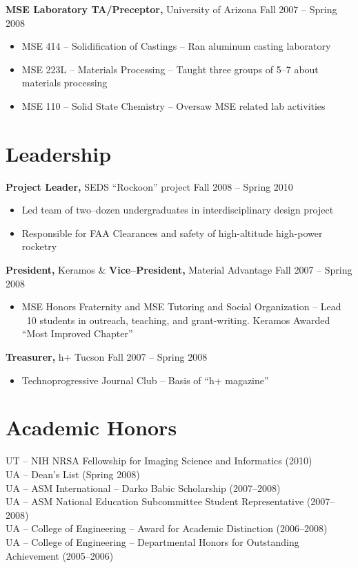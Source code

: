 \documentclass{res}
\begin{document}
\begin{resume}
{\bf MSE Laboratory TA/Preceptor,} University of Arizona \hfill Fall 2007 -- Spring 2008
\begin{itemize} \itemsep -2pt 
\item MSE 414 -- Solidification of Castings -- Ran aluminum casting laboratory 
\item MSE 223L -- Materials Processing -- Taught three groups of 5--7
  about materials processing
\item MSE 110 -- Solid State Chemistry -- Oversaw MSE related lab
  activities
\end{itemize}

\section{Leadership} 
{\bf Project Leader,}  SEDS ``Rockoon''  project \hfill   Fall 2008 -- Spring 2010
\begin{itemize} \itemsep -2pt
\item Led team of two--dozen undergraduates in interdisciplinary design project
\item Responsible for FAA Clearances and safety of high-altitude high-power rocketry 
\end{itemize}

{\bf President,} Keramos \& {\bf Vice--President,} Material Advantage  \hfill  Fall 2007 -- Spring 2008

\begin{itemize} \itemsep -2pt
\item MSE Honors Fraternity and MSE Tutoring and Social Organization -- Lead ~10 students in outreach,
  teaching, and grant-writing. Keramos Awarded ``Most Improved Chapter''  
\end{itemize}

{\bf Treasurer,} h+ Tucson \hfill Fall 2007 -- Spring 2008
\begin{itemize} \itemsep -2pt
\item Technoprogressive Journal Club -- Basis of ``h+ magazine''
\end{itemize}

\section{Academic Honors} 
UT -- NIH NRSA Fellowship for Imaging Science and Informatics (2010)\\
UA -- Dean’s List (Spring 2008) \\
UA -- ASM International -- Darko Babic Scholarship (2007--2008) \\
UA -- ASM National Education Subcommittee Student Representative (2007--2008) \\
UA -- College of Engineering -- Award for Academic Distinction (2006--2008) \\
UA -- College of Engineering -- Departmental Honors for Outstanding Achievement (2005--2006)


\end{resume}
\end{document}
